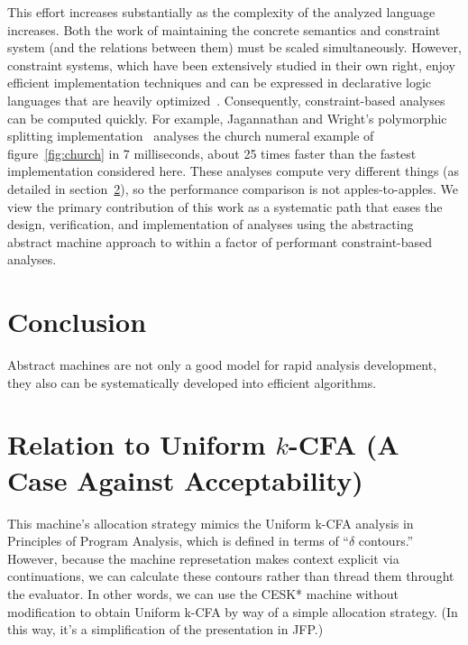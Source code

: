 \documentclass[preprint,onecolumn,9pt]{sigplanconf} %
\begin{document}
This effort increases substantially as the complexity of the analyzed
language increases.  Both the work of maintaining the concrete
semantics and constraint system (and the relations between them) must
be scaled simultaneously.  However, constraint systems, which have
been extensively studied in their own right, enjoy efficient
implementation techniques and can be expressed in declarative logic
languages that are heavily
optimized~\cite{dvanhorn:bravenboer-smaragdakis-oopsla09}.
Consequently, constraint-based analyses can be computed quickly.  For
example, Jagannathan and Wright's polymorphic splitting
implementation~\cite{dvanhorn:wright-jagannathan-toplas98} analyses
the church numeral example of figure~\ref{fig:church} in 7
milliseconds, about 25 times faster than the fastest implementation
considered here.  These analyses compute very different things (as
detailed in section~\ref{sec:accept}), so the performance comparison
is not apples-to-apples.  We view the primary contribution of this
work as a systematic path that eases the design, verification, and
implementation of analyses using the abstracting abstract machine
approach to within a factor of performant constraint-based analyses.

\section{Conclusion}
\label{sec:conclusion}

Abstract machines are not only a good model for rapid analysis
development, they also can be systematically developed into efficient
algorithms.






\appendix
\section{Relation to Uniform \(k\)-CFA (A Case Against Acceptability)}
\label{sec:accept}

\cite{dvanhorn:nielson-nielson-popl97} \cite{dvanhorn:Neilson:1999}

This machine's allocation strategy mimics the Uniform k-CFA analysis
in Principles of Program Analysis, which is defined in terms of
``$\delta$ contours.''  However, because the machine represetation makes
context explicit via continuations, we can calculate these contours
rather than thread them throught the evaluator.  In other words, we
can use the CESK* machine without modification to obtain Uniform k-CFA
by way of a simple allocation strategy.  (In this way, it's a
simplification of the presentation in JFP.)
\end{document}
